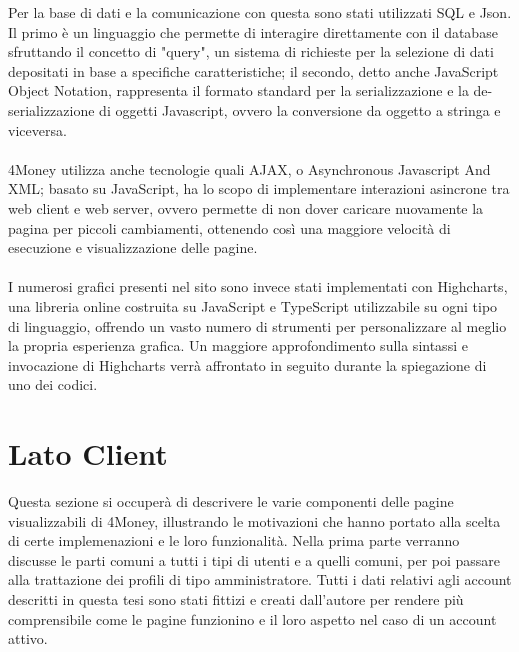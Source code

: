 \documentclass[binding=0.6cm, oneside, noexaminfo, italian]{sapthesis}
\begin{document}
Per la base di dati e la comunicazione con questa sono stati utilizzati SQL e Json. Il primo è un linguaggio che permette di interagire direttamente con il database sfruttando il concetto di "query", un sistema di richieste per la selezione di dati depositati in base a specifiche caratteristiche; il secondo, detto anche JavaScript Object Notation, rappresenta il formato standard per la serializzazione e la de-serializzazione di oggetti Javascript, ovvero la conversione da oggetto a stringa e viceversa. \cite{Slides}\\ \\
4Money utilizza anche tecnologie quali AJAX, o Asynchronous Javascript And XML; basato su JavaScript, ha lo scopo di implementare interazioni asincrone tra web client e web server, ovvero permette di non dover caricare nuovamente la pagina per piccoli cambiamenti, ottenendo così una maggiore velocità di esecuzione e visualizzazione delle pagine. \cite{Slides}\\ \\
I numerosi grafici presenti nel sito sono invece stati implementati con Highcharts, una libreria online costruita su JavaScript e TypeScript utilizzabile su ogni tipo di linguaggio, offrendo un vasto numero di strumenti per personalizzare al meglio la propria esperienza grafica. Un maggiore approfondimento sulla sintassi e invocazione di Highcharts verrà affrontato in seguito durante la spiegazione di uno dei codici. \cite{Highcharts}

\newpage
\section{Lato Client}
Questa sezione si occuperà di descrivere le varie componenti delle pagine visualizzabili di 4Money, illustrando le motivazioni che hanno portato alla scelta di certe implemenazioni e le loro funzionalità. Nella prima parte verranno discusse le parti comuni a tutti i tipi di utenti e a quelli comuni, per poi passare alla trattazione dei profili di tipo amministratore. Tutti i dati relativi agli account descritti in questa tesi sono stati fittizi e creati dall'autore per rendere più comprensibile come le pagine funzionino e il loro aspetto nel caso di un account attivo.
\end{document}
